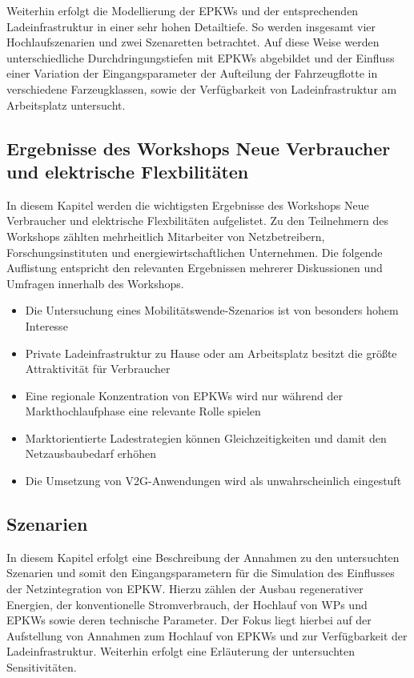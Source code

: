 Weiterhin erfolgt die Modellierung der \glspl{EPKW} und der entsprechenden Ladeinfrastruktur in einer sehr hohen Detailtiefe.
So werden insgesamt vier Hochlaufszenarien und zwei Szenaretten betrachtet.
Auf diese Weise werden unterschiedliche Durchdringungstiefen mit \glspl{EPKW} abgebildet und der Einfluss einer Variation der Eingangsparameter der \glqq Aufteilung der Fahrzeugflotte in verschiedene Farzeugklassen\grqq , sowie der \glqq Verfügbarkeit von Ladeinfrastruktur am Arbeitsplatz\grqq{} untersucht.


\subsection{Ergebnisse des Workshops \glqq Neue Verbraucher und elektrische Flexbilitäten\grqq{}}

In diesem Kapitel werden die wichtigsten Ergebnisse des Workshops \glqq Neue Verbraucher und elektrische Flexbilitäten\grqq{} aufgelistet.
Zu den Teilnehmern des Workshops zählten mehrheitlich Mitarbeiter von Netzbetreibern, Forschungsinstituten und energiewirtschaftlichen Unternehmen.
Die folgende Auflistung entspricht den relevanten Ergebnissen mehrerer Diskussionen und Umfragen innerhalb des Workshops.

\begin{itemize}
	\item Die Untersuchung eines Mobilitätswende-Szenarios ist von besonders hohem Interesse
	\item Private Ladeinfrastruktur zu Hause oder am Arbeitsplatz besitzt die größte Attraktivität für Verbraucher
	\item Eine regionale Konzentration von \glspl{EPKW} wird nur während der Markthochlaufphase eine relevante Rolle spielen
	\item Marktorientierte Ladestrategien können Gleichzeitigkeiten und damit den Netzausbaubedarf erhöhen
	\item Die Umsetzung von \gls{V2G}-Anwendungen wird als unwahrscheinlich eingestuft
	
\end{itemize}


\subsection{Szenarien}

In diesem Kapitel erfolgt eine Beschreibung der Annahmen zu den untersuchten Szenarien und somit den Eingangsparametern für die Simulation des Einflusses der Netzintegration von \gls{EPKW}.
Hierzu zählen der Ausbau regenerativer Energien, der konventionelle Stromverbrauch, der Hochlauf von \glspl{WP} und \glspl{EPKW} sowie deren technische Parameter.
Der Fokus liegt hierbei auf der Aufstellung von Annahmen zum Hochlauf von \glspl{EPKW} und zur Verfügbarkeit der Ladeinfrastruktur.
Weiterhin erfolgt eine Erläuterung der untersuchten Sensitivitäten.



